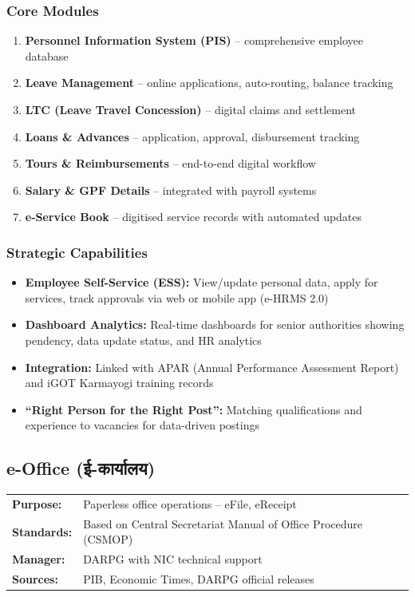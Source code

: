 \documentclass[12pt,a4paper]{article}
\newcommand{\hindi}[1]{{\hindifont #1}}
\begin{document}
\subsubsection{Core Modules}

\begin{enumerate}[label=\arabic*., leftmargin=2cm]
  \item \textbf{Personnel Information System (PIS)}  --  comprehensive employee database
  \item \textbf{Leave Management}  --  online applications, auto-routing, balance tracking
  \item \textbf{LTC (Leave Travel Concession)}  --  digital claims and settlement
  \item \textbf{Loans \& Advances}  --  application, approval, disbursement tracking
  \item \textbf{Tours \& Reimbursements}  --  end-to-end digital workflow
  \item \textbf{Salary \& GPF Details}  --  integrated with payroll systems
  \item \textbf{e-Service Book}  --  digitised service records with automated updates
\end{enumerate}

\subsubsection{Strategic Capabilities}
\begin{itemize}
  \item \textbf{Employee Self-Service (ESS):} View/update personal data, apply for services, track approvals via web or mobile app (e-HRMS 2.0)
  \item \textbf{Dashboard Analytics:} Real-time dashboards for senior authorities showing pendency, data update status, and HR analytics
  \item \textbf{Integration:} Linked with APAR (Annual Performance Assessment Report) and iGOT Karmayogi training records
  \item \textbf{``Right Person for the Right Post'':} Matching qualifications and experience to vacancies for data-driven postings
\end{itemize}

\subsection{e-Office (\hindi{ई-कार्यालय})}

\begin{sourcebox}
\begin{tabularx}{\textwidth}{@{}lX@{}}
\textbf{Purpose:} & Paperless office operations  --  eFile, eReceipt \\
\textbf{Standards:} & Based on Central Secretariat Manual of Office Procedure (CSMOP) \\
\textbf{Manager:} & DARPG with NIC technical support \\
\textbf{Sources:} & PIB, Economic Times, DARPG official releases \\
\end{tabularx}
\end{sourcebox}
\end{document}
